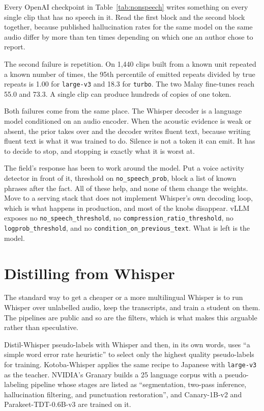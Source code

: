 \documentclass[preprint]{article}
\begin{document}
Every OpenAI checkpoint in Table~\ref{tab:nonspeech} writes something on every single clip
that has no speech in it. Read
the first block and the second block together, because published hallucination rates for the
same model on the same audio differ by more than ten times depending on which one an author
chose to report.

The second failure is repetition. On 1,440 clips built from a known unit repeated a known
number of times, the 95th percentile of emitted repeats divided by true repeats is 1.00 for
\texttt{large-v3} and 18.3 for \texttt{turbo}. The two Malay fine-tunes reach 55.0 and 73.3.
A single clip can produce hundreds of copies of one token.

Both failures come from the same place. The Whisper decoder is a language model conditioned on
an audio encoder. When the acoustic evidence is weak or absent, the prior takes over and the
decoder writes fluent text, because writing fluent text is what it was trained to do. Silence
is not a token it can emit. It has to decide to stop, and stopping is exactly what it is worst
at.

The field's response has been to work around the model. Put a voice activity detector in front
of it, threshold on \texttt{no\_speech\_prob}, block a list of known phrases after the fact.
All of these help, and none of them change the weights. Move to a serving stack that does not
implement Whisper's own decoding loop, which is what happens in production, and most of the
knobs disappear. vLLM exposes no \texttt{no\_speech\_threshold}, no
\texttt{compression\_ratio\_threshold}, no \texttt{logprob\_threshold}, and no
\texttt{condition\_on\_previous\_text}. What is left is the model.

\section{Distilling from Whisper}
\label{sec:distil}

The standard way to get a cheaper or a more multilingual Whisper is to run Whisper over
unlabelled audio, keep the transcripts, and train a student on them. The pipelines are public
and so are the filters, which is what makes this arguable rather than speculative.

Distil-Whisper \citep{gandhi2023distilwhisper} pseudo-labels with Whisper and then, in its own
words, uses ``a simple word error rate heuristic'' to select only the highest quality
pseudo-labels for training. Kotoba-Whisper \citep{kotobawhisper2024} applies the same recipe to
Japanese with \texttt{large-v3} as the teacher. NVIDIA's Granary
\citep{koluguri2025granary} builds a 25 language corpus with a pseudo-labeling pipeline whose
stages are listed as ``segmentation, two-pass inference, hallucination filtering, and
punctuation restoration'', and Canary-1B-v2 and Parakeet-TDT-0.6B-v3
\citep{sekoyan2025canaryv2} are trained on it.
\end{document}
